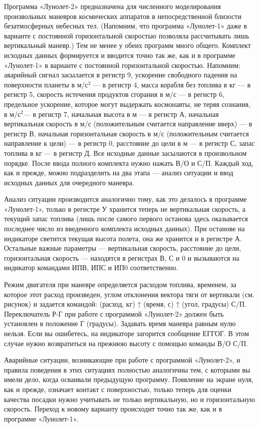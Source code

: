 \documentclass[11pt,a4paper,oneside]{article}
\begin{document}
Программа «Лунолет-2» предназначена для численного моделирования произвольных маневров космических аппаратов в непосредственной близости безатмосферных небесных тел. (Напомним, что программа «Лунолет-1» даже в варианте с постоянной горизонтальной скоростью позволяла рассчитывать лишь вертикальный маневр.) Тем не менее у обеих программ много общего. Комплект исходных данных формируется и вводится точно так же, как и в программе «Лунолет-1» в варианте с постоянной горизонтальной скоростью. Напомним: аварийный сигнал засылается в регистр 9, ускорение свободного падения на поверхности планеты в м/с$^{2}$ — в регистр 4, масса корабля без топлива в кг — в регистр 5, скорость истечения продуктов сгорания в м/с — в регистр 6, предельное ускорение, которое могут выдержать космонавты, не теряя сознания, в м/с$^{2}$— в регистр 7, начальная высота в м — в регистр А, начальная вертикальная скорость в м/с (положительным считается направление вверх) — в регистр В, начальная горизонтальная скорость в м/с (положительным считается направление к цели) — в регистр 0, расстояние до цели в м — в регистр С, запас топлива в кг — в регистр Д. Все исходные данные засылаются в произвольном порядке. После ввода полного комплекта нужно нажать В/О и С/П. Каждый ход, как и прежде, можно подразделить на два этапа — анализ ситуации и ввод исходных данных для очередного маневра.

Анализ ситуации производится аналогично тому, как это делалось в программе «Лунолет-1», только в регистре У хранится теперь не вертикальная скорость, а текущий запас топлива (лишь после самого первого останова здесь оказывается последнее число из введенного комплекта исходных данных). При останове на индикаторе светится текущая высота полета, она же хранится и в регистре А. Остальные важные параметры — вертикальная скорость, расстояние до цели, горизонтальная скорость — находятся в регистрах В, С и 0 и вызываются на индикатор командами ИПВ, ИПС и ИП0 соответственно.

Режим двигателя при маневре определяется расходом топлива, временем, за которое этот расход произведен, углом отклонения вектора тяги от вертикали (см. рисунок) и задается командой: (расход, кг) ↑ (время, с) ↑ (угол, градусы) С/П. Переключатель Р-Г при работе с программой «Лунолет-2» должен быть установлен в положение Г (градусы). Задавать время маневра равным нулю нельзя. Если вы ошибетесь, на индикаторе загорится сообщение ЕГГОГ. В этом случае нужно возвратиться на прежнюю высоту с помощью команды В/О С/П.

Аварийные ситуации, возникающие при работе с программой «Лунолет-2», и правила поведения в этих ситуациях полностью аналогичны тем, с которыми вы имели дело, когда осваивали предыдущую программу. Появление на экране нуля, как и прежде, означает контакт с поверхностью, только теперь для оценки качества посадки нужно учитывать не только вертикальную, но и горизонтальную скорость. Переход к новому варианту происходит точно так же, как и в программе «Лунолет-1».
\end{document}
